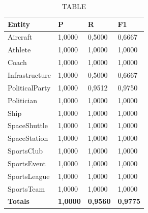 \documentclass[thesis=M,english]{FITthesis}[2018/05/30]
\begin{document}
	
	\begin{table}[H]\centering
		\caption{TABLE}
		\label{}
		\begin{tabular}{|l|l|l|l|}
			\hline {\textbf{Entity}} & {\textbf{P}} & {\textbf{R}} & {\textbf{F1}}\\\hline
				Aircraft & 1,0000 & 0,5000 & 0,6667\\
				Athlete & 1,0000 & 1,0000 & 1,0000\\
				Coach & 1,0000 & 1,0000 & 1,0000\\
				Infrastructure & 1,0000 & 0,5000 & 0,6667\\
				PoliticalParty & 1,0000 & 0,9512 & 0,9750\\
				Politician & 1,0000 & 1,0000 & 1,0000\\
				Ship & 1,0000 & 1,0000 & 1,0000\\
				SpaceShuttle & 1,0000 & 1,0000 & 1,0000\\
				SpaceStation & 1,0000 & 1,0000 & 1,0000\\ 
				SportsClub & 1,0000 & 1,0000 & 1,0000\\
				SportsEvent & 1,0000 & 1,0000 & 1,0000\\
				SportsLeague & 1,0000 & 1,0000 & 1,0000\\
				SportsTeam & 1,0000 & 1,0000 & 1,0000\\\hline
				\textbf{Totals} & \textbf{1,0000} & \textbf{0,9560} & \textbf{0,9775}\\\hline
		\end{tabular}
	\end{table}
\end{document}
